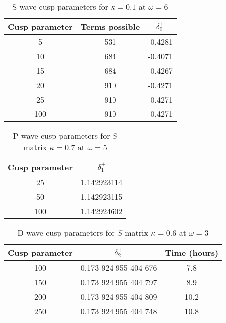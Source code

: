 \documentclass[Dissertation.tex]{subfiles}
\begin{document}
\begin{table}[H]
\centering
\begin{tabular}{c c c}
\toprule
Cusp parameter & Terms possible & $\delta_0^+$ \\
\midrule
 5 & 531 & -0.4281 \\
10 & 684 & -0.4071 \\
15 & 684 & -0.4267 \\
20 & 910 & -0.4271 \\
25 & 910 & -0.4271 \\
100 & 910 & -0.4271 \\
\bottomrule
\end{tabular}
\caption{S-wave cusp parameters for $\kappa = 0.1$ at $\omega = 6$}
\label{tab:SWaveCuspParameters}
\end{table}

\begin{table}[H]
\centering
\begin{tabular}{c c}
\toprule
Cusp parameter & $\delta_1^+$ \\
\midrule
 25 & 1.142923114 \\
 50 & 1.142923115 \\
100 & 1.142924602 \\
\bottomrule
\end{tabular}
\caption{P-wave cusp parameters for $S$ matrix $\kappa = 0.7$ at $\omega = 5$}
\label{tab:PWaveCuspParameters}
\end{table}


\begin{table}[H]
\centering
\begin{tabular}{c c c}
\toprule
Cusp parameter & $\delta_2^+$ & Time (hours) \\
\midrule
100 & 0.173 924 955 404 676 & 7.8 \\
150 & 0.173 924 955 404 797 & 8.9 \\
200 & 0.173 924 955 404 809 & 10.2 \\
250 & 0.173 924 955 404 748 & 10.8 \\
\bottomrule
\end{tabular}
\caption{D-wave cusp parameters for $S$ matrix $\kappa = 0.6$ at $\omega = 3$}
\label{tab:DWaveCuspParameters}
\end{table}
\end{document}
